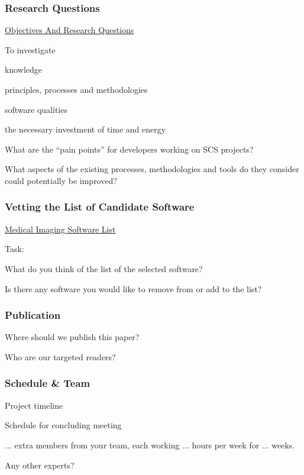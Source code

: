 \documentclass[t,12pt,numbers,fleqn]{beamer}
\begin{document}
\begin{frame}
\frametitle{Research Questions}

\href{https://github.com/smiths/AIMSS/blob/master/OverallResearchProposal/ObjectivesAndResearchQuestions.pdf}{Objectives
And Research Questions}

\bi
\item To investigate
\bi
\item knowledge
\item principles, processes and methodologies
\item software qualities
\item the necessary investment of time and energy
\ei
\item What are the ``pain points'' for
developers working on SCS projects?
\item What aspects of the existing processes, methodologies and tools do they consider could potentially be improved?
\ei

\end{frame}


\begin{frame}
\frametitle{Vetting the List of Candidate Software}

\href{https://docs.google.com/spreadsheets/d/122wU0v3ZtvDcqy8C4zKJ89kU-8fXAbo3Mzn6vcVXOi0/edit?usp=sharing}{Medical Imaging Software List}

Task:
\bi
\item What do you think of the list of the selected software?
\item Is there any software you would like to remove from or add to the list?
\ei

\end{frame}


\begin{frame}
\frametitle{Publication}

\bi
\item Where should we publish this paper?
\item Who are our targeted readers?
\ei

\end{frame}


\begin{frame}
\frametitle{Schedule \& Team}

\bi
\item Project timeline
\item Schedule for concluding meeting
\item ... extra members from your team, each working ... hours per week for ...
weeks.
\item Any other experts?
\ei

\end{frame}
\end{document}
